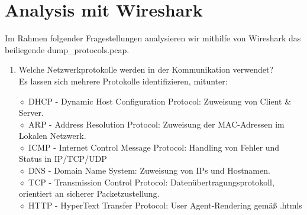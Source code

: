 \documentclass[11pt]{article}
\begin{document}
    \section{Analysis mit Wireshark}
    Im Rahmen folgender Fragestellungen analysieren wir mithilfe von Wireshark das beiliegende dump\_protocols.pcap.
    \begin{enumerate}[\thesection .1]
        \item Welche Netzwerkprotokolle werden in der Kommunikation verwendet?\\
        Es lassen sich mehrere Protokolle identifizieren, mitunter:
        \begin{addmargin}[1em]{1em}
            $\diamond$ DHCP - Dynamic Host Configuration Protocol: Zuweisung von Client \& Server.\\
            $\diamond$ ARP - Address Resolution Protocol: Zuweisung der MAC-Adressen im Lokalen Netzwerk.\\
            $\diamond$ ICMP - Internet Control Message Protocol: Handling von Fehler und Status in IP/TCP/UDP\\
            $\diamond$ DNS - Domain Name System: Zuweisung von IPs und Hostnamen.\\
            $\diamond$ TCP - Transmission Control Protocol: Datenübertragungsprotokoll, orientiert an sicherer Packetzustellung.\\
            $\diamond$ HTTP - HyperText Transfer Protocol: User Agent-Rendering gemäß .htmls\\
        \end{addmargin}


\end{enumerate}
\end{document}
